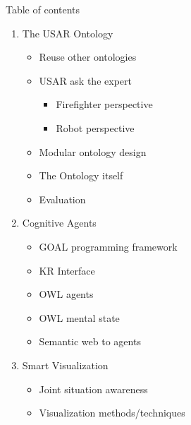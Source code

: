 Table of contents
\tableofcontents{}

\begin{enumerate}
\item The USAR Ontology
\begin{itemize}
\item Reuse other ontologies
\item USAR ask the expert 
\begin{itemize}
\item Firefighter perspective
\item Robot perspective
\end{itemize}
\item Modular ontology design

\item The Ontology itself
\item Evaluation
\end{itemize}

\item Cognitive Agents
\begin{itemize}
\item GOAL programming framework
\item KR Interface
\item OWL agents
\item OWL mental state
\item Semantic web to agents
\end{itemize}

\item Smart Visualization
\begin{itemize}
\item Joint situation awareness
\item Visualization methods/techniques
\end{itemize}
\end{enumerate}